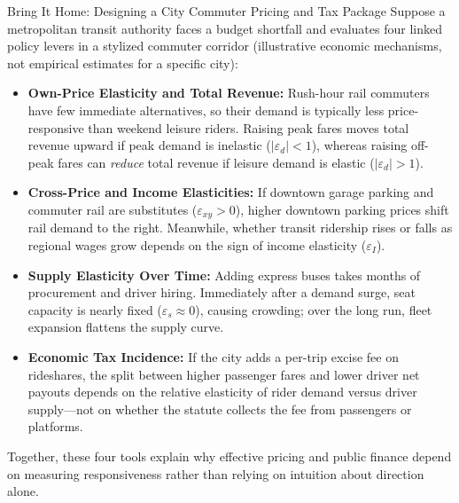 \documentclass[11pt,letterpaper]{article}
\begin{document}
\begin{examplecase}{Bring It Home: Designing a City Commuter Pricing and Tax Package}
Suppose a metropolitan transit authority faces a budget shortfall and evaluates four linked policy levers in a stylized commuter corridor (illustrative economic mechanisms, not empirical estimates for a specific city):
\begin{itemize}
    \item \textbf{Own-Price Elasticity and Total Revenue:} Rush-hour rail commuters have few immediate alternatives, so their demand is typically less price-responsive than weekend leisure riders. Raising peak fares moves total revenue upward if peak demand is inelastic ($|\varepsilon_d| < 1$), whereas raising off-peak fares can \emph{reduce} total revenue if leisure demand is elastic ($|\varepsilon_d| > 1$).
    \item \textbf{Cross-Price and Income Elasticities:} If downtown garage parking and commuter rail are substitutes ($\varepsilon_{xy} > 0$), higher downtown parking prices shift rail demand to the right. Meanwhile, whether transit ridership rises or falls as regional wages grow depends on the sign of income elasticity ($\varepsilon_I$).
    \item \textbf{Supply Elasticity Over Time:} Adding express buses takes months of procurement and driver hiring. Immediately after a demand surge, seat capacity is nearly fixed ($\varepsilon_s \approx 0$), causing crowding; over the long run, fleet expansion flattens the supply curve.
    \item \textbf{Economic Tax Incidence:} If the city adds a per-trip excise fee on rideshares, the split between higher passenger fares and lower driver net payouts depends on the relative elasticity of rider demand versus driver supply—not on whether the statute collects the fee from passengers or platforms.
\end{itemize}
Together, these four tools explain why effective pricing and public finance depend on measuring responsiveness rather than relying on intuition about direction alone.
\end{examplecase}
\end{document}
